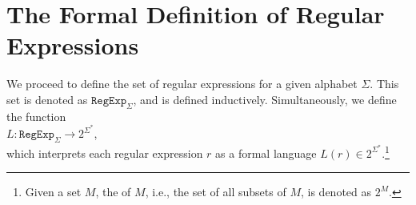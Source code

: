 \section{The Formal Definition of Regular Expressions}
We proceed to define the set of regular expressions for a given alphabet $ \Sigma $. This set is denoted as
$ \texttt{RegExp}_\Sigma $, and is defined inductively. Simultaneously, we define the function 
\\[0.2cm]
\hspace*{1.3cm}
$L: \texttt{RegExp}_\Sigma \rightarrow 2^{\Sigma^*}$,
\\[0.2cm]
which interprets each regular expression $ r $ as a formal language $ L(r) \in 2^{\Sigma^*} $.\footnote{
  Given a set $ M $, the  of $ M $, i.e., the set of all subsets of $ M $, is denoted as $ 2^M $.
}

